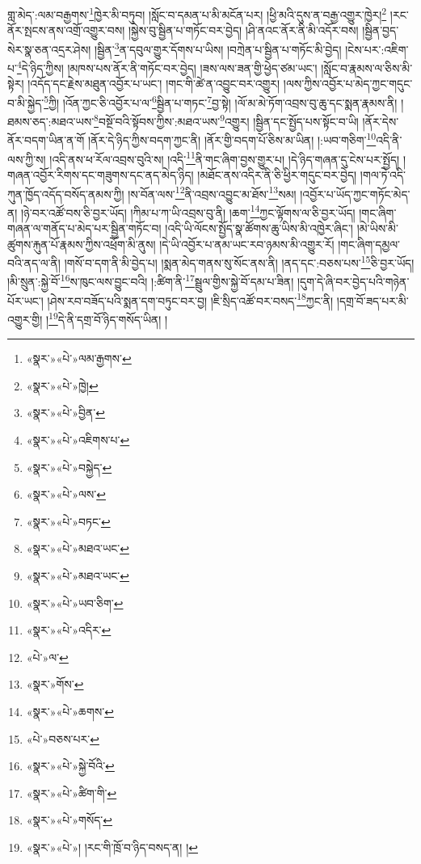 གླ་མེད་:ལམ་བརྒྱགས་\footnote{«སྣར་»«པེ་»ལམ་རྒྱགས་}ཁྱེར་མི་བཏུབ། །སློང་བ་དམན་པ་མི་མངོན་པར། །ཕྱི་མའི་དུས་ན་བརྒྱ་འགྱུར་ཁྱེར།\footnote{«སྣར་»«པེ་»ཁྱེ།} །རང་ནོར་སྤངས་ནས་འགྲོ་འགྱུར་བས། །སྐྱེས་བུ་སྦྱིན་པ་གཏོང་བར་བྱེད། །ཤི་ནའང་ནོར་ནི་མི་འདོར་བས། །སྦྱིན་བྱད་སེར་སྣ་ཅན་འདྲར་ཤེས། །སྦྱིན་\footnote{«སྣར་»«པེ་»བྱིན་}ན་དབུལ་གྱུར་དོགས་པ་ཡིས། །བཀྲེན་པ་སྦྱིན་པ་གཏོང་མི་བྱེད། །ངེས་པར་:འཇིག་པ་\footnote{«སྣར་»«པེ་»འཇིགས་པ་}དེ་ཉིད་ཀྱིས། །མཁས་པས་ནོར་ནི་གཏོང་བར་བྱེད། །ཟས་ལས་ཟན་གྱི་ཕྱེད་ཙམ་ཡང་། །སློང་བ་རྣམས་ལ་ཅིས་མི་སྟེར། །འདོད་དང་རྗེས་མཐུན་འབྱོར་པ་ཡང་། །གང་གི་ཚེ་ན་འབྱུང་བར་འགྱུར། །ལས་ཀྱིས་འབྱོར་པ་མེད་ཀྱང་གདུང་བ་མི་སྐྱེད་\footnote{«སྣར་»«པེ་»བསྐྱེད་}ཀྱི། །འོན་ཀྱང་ཅི་འབྱོར་པ་ལ་\footnote{«སྣར་»«པེ་»ལས་}སྦྱིན་པ་གཏང་\footnote{«སྣར་»«པེ་»བཏང་}བྱ་སྟེ། །ལོ་མ་མེ་ཏོག་འབྲས་བུ་ཆུ་དང་སྨན་རྣམས་ནི། །ཐམས་ཅད་:མཐའ་ཡས་\footnote{«སྣར་»«པེ་»མཐའ་ཡང་}བསྔོ་བའི་སྟོབས་ཀྱིས་:མཐའ་ཡས་\footnote{«སྣར་»«པེ་»མཐའ་ཡང་}འགྱུར། །སྦྱིན་དང་སྤྱོད་པས་སྟོང་བ་ཡི། །ནོར་དེས་ནོར་བདག་ཡིན་ན་གོ །ནོར་དེ་ཉིད་ཀྱིས་བདག་ཀྱང་ནི། །ནོར་གྱི་བདག་པོ་ཅིས་མ་ཡིན། །:ཡབ་གཅིག་\footnote{«སྣར་»«པེ་»ཡབ་ཅིག་}འདི་ནི་ལས་ཀྱི་ས། །འདི་ནས་ཕ་རོལ་འབྲས་བུའི་ས། །འདི་\footnote{«སྣར་»«པེ་»འདིར་}ནི་གང་ཞིག་བྱས་གྱུར་པ། །དེ་ཉིད་གཞན་དུ་ངེས་པར་སྤྱོད། །གཞན་འབྱོར་རིགས་དང་གཟུགས་དང་ནད་མེད་ཉིད། །མཐོང་ནས་འདིར་ནི་ཅི་ཕྱིར་གདུང་བར་བྱེད། །གལ་ཏེ་འདི་ཀུན་ཁྱོད་འདོད་བསོད་ནམས་ཀྱི། །ས་བོན་ལས་\footnote{«པེ་»ལ་}ནི་འབྲས་འབྱུང་མ་ཐོས་\footnote{«སྣར་»གོས་}སམ། །འབྱོར་པ་ཡོད་ཀྱང་གཏོང་མེད་ན། །ཉེ་བར་འཚོ་བས་ཅི་བྱར་ཡོད། །ཀིམ་པ་ཀ་ཡི་འབྲས་བུ་ནི། །ཆག་\footnote{«སྣར་»«པེ་»ཆགས་}ཀྱང་ལྟོགས་ལ་ཅི་བྱར་ཡོད། །གང་ཞིག་གཞན་ལ་གནོད་པ་མེད་པར་སྦྱིན་གཏོང་བ། །འདི་ཡི་ལོངས་སྤྱོད་སྣ་ཚོགས་ཆུ་ཡིས་མི་འཁྱེར་ཞིང་། །མེ་ཡིས་མི་ཚུགས་རྐུན་པོ་རྣམས་ཀྱིས་འཕྲོག་མི་ནུས། །དེ་ཡི་འབྱོར་པ་ནམ་ཡང་རབ་ཉམས་མི་འགྱུར་རོ། །གང་ཞིག་དམྱལ་བའི་ནད་ལ་ནི། །གསོ་བ་དག་ནི་མི་བྱེད་པ། །སྨན་མེད་གནས་སུ་སོང་ནས་ནི། །ནད་དང་:བཅས་པས་\footnote{«པེ་»བཅས་པར་}ཅི་བྱར་ཡོད། །མི་སྲུན་:སྐྱེ་བོ་\footnote{«སྣར་»«པེ་»སྐྱེ་བོའི་}ས་ཁུང་ལས་བྱུང་བའི། །:ཚིག་ནི་\footnote{«སྣར་»«པེ་»ཚིག་གི་}སྦྲུལ་གྱིས་སྐྱེ་བོ་དམ་པ་ཟིན། །དུག་དེ་ཞི་བར་བྱེད་པའི་གཉེན་པོར་ཡང་། །ཤེས་རབ་བཟོད་པའི་སྨན་དག་བཏུང་བར་བྱ། །ཇི་སྲིད་འཚོ་བར་བསད་\footnote{«སྣར་»«པེ་»གསོད་}ཀྱང་ནི། །དགྲ་བོ་ཟད་པར་མི་འགྱུར་གྱི། །\footnote{«སྣར་»«པེ་»། །རང་གི་ཁྲོ་བ་ཉིད་བསད་ན། །}དེ་ནི་དགྲ་བོ་ཉིད་གསོད་ཡིན། །
